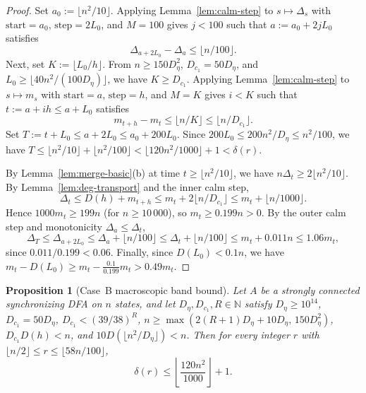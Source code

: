 \documentclass[11pt]{article}
\newtheorem{proposition}[theorem]{Proposition}
\theoremstyle{definition}
\theoremstyle{remark}
\newcommand{\N}{\mathbb{N}}
\begin{document}
\begin{proof}
Set $a_0 := \lfloor n^2 / 10 \rfloor$. Applying Lemma~\ref{lem:calm-step} to $s \mapsto \Delta_s$ with $\mathrm{start} = a_0$, $\mathrm{step} = 2 L_0$, and $M = 100$ gives $j < 100$ such that $a := a_0 + 2 j L_0$ satisfies
\[
  \Delta_{a + 2 L_0} - \Delta_a \le \lfloor n / 100 \rfloor.
\]
Next, set $K := \lfloor L_0 / h \rfloor$. From $n \ge 150 D_\eta^2$, $D_{c_1} = 50 D_\eta$, and $L_0 \ge \lfloor 40 n^2 / (100 D_\eta) \rfloor$, we have $K \ge D_{c_1}$. Applying Lemma~\ref{lem:calm-step} to $s \mapsto m_s$ with $\mathrm{start} = a$, $\mathrm{step} = h$, and $M = K$ gives $i < K$ such that $t := a + i h \le a + L_0$ satisfies
\[
  m_{t + h} - m_t \le \lfloor n / K \rfloor \le \lfloor n / D_{c_1} \rfloor.
\]
Set $T := t + L_0 \le a + 2 L_0 \le a_0 + 200 L_0$. Since $200 L_0 \le 200 n^2 / D_\eta \le n^2 / 100$, we have $T \le \lfloor n^2/10 \rfloor + \lfloor n^2/100 \rfloor < \lfloor 120 n^2/1000 \rfloor + 1 < \delta(r)$.

By Lemma~\ref{lem:merge-basic}(b) at time $t \ge \lfloor n^2/10 \rfloor$, we have $n \Delta_t \ge 2 \lfloor n^2/10 \rfloor$. By Lemma~\ref{lem:deg-transport} and the inner calm step,
\[
  \Delta_t \le D(h) + m_{t+h} \le m_t + 2 \lfloor n / D_{c_1} \rfloor \le m_t + \lfloor n / 1000 \rfloor.
\]
Hence $1000 m_t \ge 199 n$ (for $n \ge 10\,000$), so $m_t \ge 0.199 n > 0$. By the outer calm step and monotonicity $\Delta_a \le \Delta_t$,
\[
  \Delta_T \le \Delta_{a + 2 L_0} \le \Delta_a + \lfloor n / 100 \rfloor \le \Delta_t + \lfloor n / 100 \rfloor \le m_t + 0.011 n \le 1.06 m_t,
\]
since $0.011 / 0.199 < 0.06$. Finally, since $D(L_0) < 0.1 n$, we have $m_t - D(L_0) \ge m_t - \frac{0.1}{0.199} m_t > 0.49 m_t$.
\end{proof}

\begin{proposition}[Case~B macroscopic band bound]\label{prop:caseB-band}
Let $A$ be a strongly connected synchronizing DFA on $n$ states, and let $D_\eta, D_{c_1}, R \in \N$ satisfy $D_\eta \ge 10^{14}$, $D_{c_1} = 50 D_\eta$, $D_{c_1} < (39/38)^R$, $n \ge \max(2(R+1)D_\eta + 10 D_\eta,\, 150 D_\eta^2)$, $D_{c_1} D(h) < n$, and $10 D(\lfloor n^2 / D_\eta \rfloor) < n$. Then for every integer $r$ with $\lfloor n / 2 \rfloor \le r \le \lfloor 58 n / 100 \rfloor$,
\[
  \delta(r) \le \left\lfloor \frac{120 n^2}{1000} \right\rfloor + 1.
\]
\end{proposition}
\end{document}
